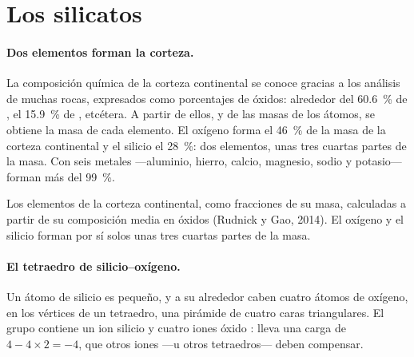 \section{Los silicatos}

\paragraph{Dos elementos forman la corteza.} La composición química de la
corteza continental se conoce gracias a los análisis de muchas rocas,
expresados como porcentajes de óxidos: alrededor del \qty{60.6}{\percent} de
, el \qty{15.9}{\percent} de , etcétera. A partir de ellos,
y de las masas de los átomos, se obtiene la masa de cada elemento. El oxígeno
forma el \qty{46}{\percent} de la masa de la corteza continental y el silicio
el \qty{28}{\percent}: dos elementos, unas tres cuartas partes de la masa. Con
seis metales ---aluminio, hierro, calcio, magnesio, sodio y potasio--- forman
más del \qty{99}{\percent}.

\begin{omfigure}

{\small Los elementos de la corteza continental, como fracciones de su masa,
calculadas a partir de su composición media en óxidos (Rudnick y Gao, 2014).
El oxígeno y el silicio forman por sí solos unas tres cuartas partes de la
masa.}
\end{omfigure}

\paragraph{El tetraedro de silicio--oxígeno.} Un átomo de silicio es pequeño,
y a su alrededor caben cuatro átomos de oxígeno, en los vértices de un
tetraedro, una pirámide de cuatro caras triangulares. El grupo contiene un ion
silicio  y cuatro iones óxido : lleva una carga de
$4 - 4 \times 2 = -4$, que otros iones ---u otros tetraedros--- deben
compensar.

